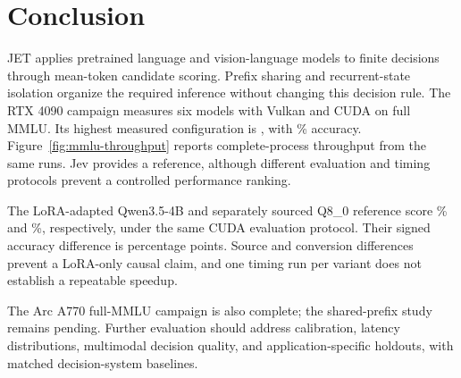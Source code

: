 \section{Conclusion}
\label{sec:conclusion}
JET applies pretrained language and vision-language models to finite decisions
through mean-token candidate scoring. Prefix sharing and recurrent-state
isolation organize the required inference without changing this decision rule.
The RTX 4090 campaign measures six models with Vulkan and CUDA on full MMLU.
Its highest measured configuration is , with
\% accuracy. Figure~\ref{fig:mmlu-throughput}
reports complete-process throughput from the same runs. Jev provides a
reference, although different evaluation and timing protocols prevent a
controlled performance ranking.

The LoRA-adapted Qwen3.5-4B and separately sourced Q8\_0 reference score
\% and
\%, respectively, under the same CUDA
evaluation protocol. Their signed accuracy difference is
 percentage points. Source and conversion
differences prevent a LoRA-only causal claim, and one timing run per variant
does not establish a repeatable speedup.

The Arc A770 full-MMLU campaign is also complete; the shared-prefix study
remains pending. Further evaluation should
address calibration, latency distributions, multimodal decision quality,
and application-specific holdouts, with matched decision-system baselines.
